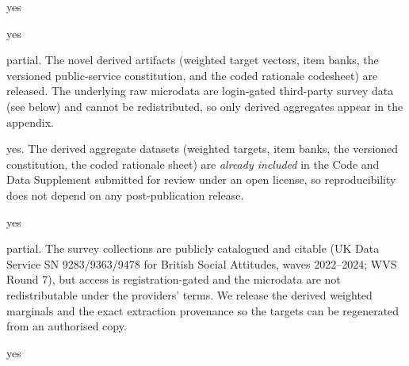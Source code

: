 \documentclass[letterpaper]{article}
\begin{document}
\begin{itemize}

yes

\begin{itemize}

	yes

	partial. The novel derived artifacts (weighted target vectors, item banks, the versioned public-service constitution, and the coded rationale codesheet) are released. The underlying raw microdata are login-gated third-party survey data (see below) and cannot be redistributed, so only derived aggregates appear in the appendix.

	yes. The derived aggregate datasets (weighted targets, item banks, the versioned constitution, the coded rationale sheet) are \emph{already included} in the Code and Data Supplement submitted for review under an open license, so reproducibility does not depend on any post-publication release.

	yes

	partial. The survey collections are publicly catalogued and citable (UK Data Service SN 9283/9363/9478 for British Social Attitudes, waves 2022--2024; WVS Round 7), but access is registration-gated and the microdata are not redistributable under the providers' terms. We release the derived weighted marginals and the exact extraction provenance so the targets can be regenerated from an authorised copy.

	yes

\end{itemize}
\end{itemize}
\end{document}
